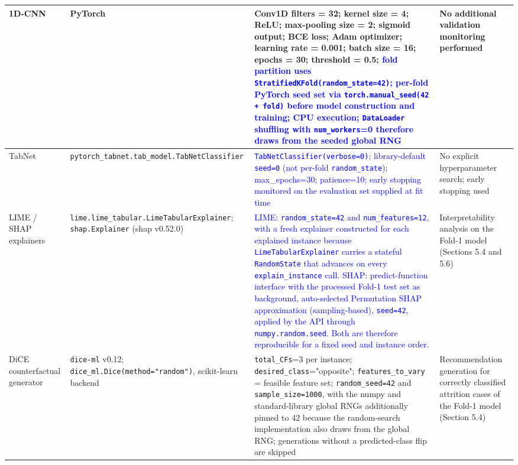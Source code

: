 \documentclass[a4paper,fleqn]{cas-sc}
\begin{document}
\begin{longtable}{p{2cm} p{7.75cm} p{3cm} p{2.25cm}}
1D-CNN 
& PyTorch 
& Conv1D filters = 32; kernel size = 4; ReLU; max-pooling size = 2; sigmoid output; BCE loss; Adam optimizer; learning rate = 0.001; batch size = 16; epochs = 30; threshold = 0.5; \textcolor{blue}{fold partition uses \texttt{StratifiedKFold(random\_state=42)}; per-fold PyTorch seed set via \texttt{torch.manual\_seed(42 + fold)} before model construction and training; CPU execution; \texttt{DataLoader} shuffling with \texttt{num\_workers}=0 therefore draws from the seeded global RNG} 
& No additional validation monitoring performed \\ 
\midrule

TabNet 
& \texttt{pytorch\_tabnet.tab\_model.TabNetClassifier} 
& \textcolor{blue}{\texttt{TabNetClassifier(verbose=0)}; library-default \texttt{seed=0} (not per-fold \texttt{random\_state}); max\_epochs=30; patience=10; early stopping monitored on the evaluation set supplied at fit time} 
& No explicit hyperparameter search; early stopping used \\ 

\midrule

LIME / SHAP explainers
& \texttt{lime.lime\_tabular.LimeTabularExplainer}; \texttt{shap.Explainer} (shap v0.52.0)
& \textcolor{blue}{LIME: \texttt{random\_state=42} and \texttt{num\_features=12}, with a fresh explainer constructed for each explained instance because \texttt{LimeTabularExplainer} carries a stateful \texttt{RandomState} that advances on every \texttt{explain\_instance} call. SHAP: predict-function interface with the processed Fold-1 test set as background, auto-selected Permutation SHAP approximation (sampling-based), \texttt{seed=42}, applied by the API through \texttt{numpy.random.seed}. Both are therefore reproducible for a fixed seed and instance order.}
& Interpretability analysis on the Fold-1 model (Sections 5.4 and 5.6) \\
\midrule

DiCE counterfactual generator
& \texttt{dice-ml} v0.12; \texttt{dice\_ml.Dice(method="random")}, scikit-learn backend
& \texttt{total\_CFs}=3 per instance; \texttt{desired\_class}="opposite"; \texttt{features\_to\_vary} = feasible feature set; \texttt{random\_seed=42} and \texttt{sample\_size=1000}, with the numpy and standard-library global RNGs additionally pinned to 42 because the random-search implementation also draws from the global RNG; generations without a predicted-class flip are skipped
& Recommendation generation for correctly classified attrition cases of the Fold-1 model (Section 5.4) \\
\midrule


\end{longtable}
\end{document}
